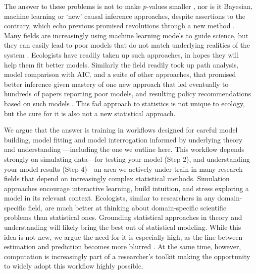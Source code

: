 \documentclass[11pt]{article}
\begin{document}
The answer to these problems is not to make $p$-values smaller \citep{halsey2015,colquhoun2017}, nor is it Bayesian, machine learning or `new' causal inference approaches, despite assertions to the contrary, which echo previous promised revolutions through a new method \citep[e.g.,][]{mitchell1992testing,Burnham2004,byrnes2025causal}. %
Many fields are increasingly using machine learning models to guide science, but they can easily lead to poor models that do not match underlying realities of the system \citep{efron2020prediction,pichler2023machine}. Ecologists have readily taken up such approaches, in hopes they will help them fit better models. Similarly the field readily took up path analysis, model comparison with AIC, and a suite of other approaches, that promised better inference given mastery of one new approach that led eventually to hundreds of papers reporting poor models, and resulting policy recommendations based on such models \citep{petraitis1996inferring,leroux2019prevalence}. This fad approach to statistics is not unique to ecology, but the cure for it is also not a new statistical approach.

We argue that the answer is training in workflows designed for careful model building, model fitting and model interrogation informed by underlying theory and understanding \citep{betanworkflow,gelman2020bayesian,vandeschoot2021}---including the one we outline here. This workflow depends strongly on simulating data---for testing your model (Step 2), and understanding your model results (Step 4)---an area we actively under-train in many research fields that depend on increasingly complex statistical methods. Simulation approaches encourage interactive learning, build intuition, and stress exploring a model in its relevant context. Ecologists, similar to researchers in any domain-specific field, are much better at thinking about domain-specific scientific problems than statistical ones. Grounding statistical approaches in theory and understanding will likely bring the best out of statistical modeling. While this idea is not new, we argue the need for it is especially high, as the line between estimation and prediction becomes more blurred \citep{shmueli2010explain}. At the same time, however, computation is increasingly part of a researcher's toolkit making the opportunity to widely adopt this workflow highly possible. 
\end{document}
